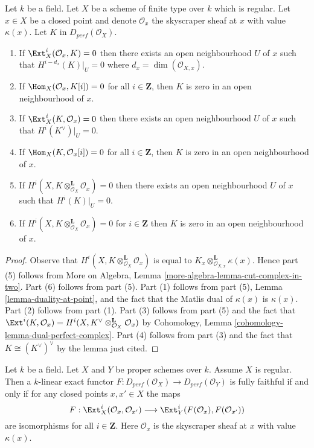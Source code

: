 \begin{lemma}
\label{lemma-orthogonal-point-sheaf}
Let $k$ be a field. Let $X$ be a scheme of finite type over $k$ which
is regular. Let $x \in X$ be a closed point and denote $\mathcal{O}_x$
the skyscraper sheaf at $x$ with value $\kappa(x)$. Let $K$ in
$D_{perf}(\mathcal{O}_X)$.
\begin{enumerate}
\item If $\Ext^i_X(\mathcal{O}_x, K) = 0$ then there exists an open
neighbourhood $U$ of $x$ such that $H^{i - d_x}(K)|_U = 0$ where
$d_x = \dim(\mathcal{O}_{X, x})$.
\item If $\Hom_X(\mathcal{O}_x, K[i]) = 0$ for all
$i \in \mathbf{Z}$, then $K$ is zero in an open neighbourhood of $x$.
\item If $\Ext^i_X(K, \mathcal{O}_x) = 0$ then there exists an open
neighbourhood $U$ of $x$ such that $H^i(K^\vee)|_U = 0$.
\item If $\Hom_X(K, \mathcal{O}_x[i]) = 0$ for all
$i \in \mathbf{Z}$, then $K$ is zero in an open neighbourhood of $x$.
\item If $H^i(X, K \otimes_{\mathcal{O}_X}^\mathbf{L} \mathcal{O}_x) = 0$
then there exists an open neighbourhood $U$ of $x$ such that
$H^i(K)|_U = 0$.
\item If $H^i(X, K \otimes_{\mathcal{O}_X}^\mathbf{L} \mathcal{O}_x) = 0$
for $i \in \mathbf{Z}$ then $K$ is zero in an
open neighbourhood of $x$.
\end{enumerate}
\end{lemma}

\begin{proof}
Observe that $H^i(X, K \otimes_{\mathcal{O}_X}^\mathbf{L} \mathcal{O}_x)$
is equal to $K_x  \otimes_{\mathcal{O}_{X, x}}^\mathbf{L} \kappa(x)$.
Hence part (5) follows from More on Algebra, Lemma
\ref{more-algebra-lemma-cut-complex-in-two}.
Part (6) follows from part (5).
Part (1) follows from part (5), Lemma \ref{lemma-duality-at-point}, and the
fact that the Matlis dual of $\kappa(x)$ is $\kappa(x)$.
Part (2) follows from part (1).
Part (3) follows from part (5) and the fact that
$\Ext^i(K, \mathcal{O}_x) =
H^i(X, K^\vee \otimes_{\mathcal{O}_X}^\mathbf{L} \mathcal{O}_x)$ by
Cohomology, Lemma \ref{cohomology-lemma-dual-perfect-complex}.
Part (4) follows from part (3) and the fact that $K \cong (K^\vee)^\vee$
by the lemma just cited.
\end{proof}

\begin{lemma}
\label{lemma-get-fully-faithful-geometric}
Let $k$ be a field. Let $X$ and $Y$ be proper schemes over $k$.
Assume $X$ is regular. Then a $k$-linear exact functor
$F : D_{perf}(\mathcal{O}_X) \to D_{perf}(\mathcal{O}_Y)$
is fully faithful if and only if
for any closed points $x, x' \in X$ the maps
$$
F : \Ext^i_X(\mathcal{O}_x, \mathcal{O}_{x'})
\longrightarrow
\Ext^i_Y(F(\mathcal{O}_x), F(\mathcal{O}_{x'}))
$$
are isomorphisms for all $i \in \mathbf{Z}$.
Here $\mathcal{O}_x$ is the skyscraper sheaf at $x$ with value $\kappa(x)$.
\end{lemma}

